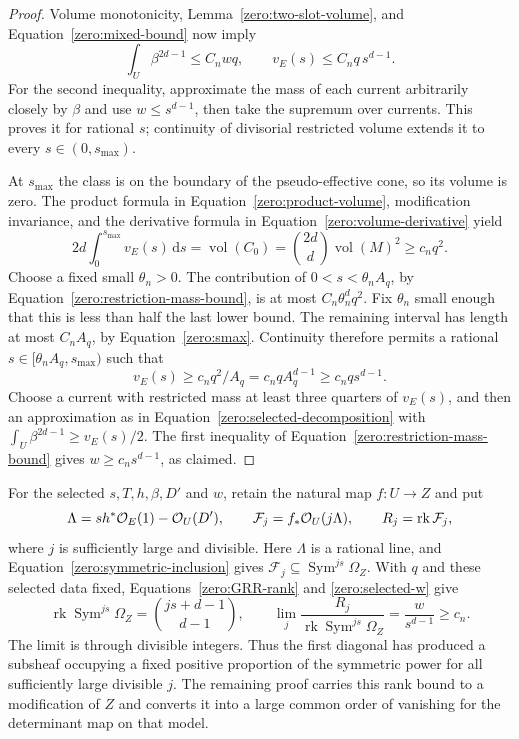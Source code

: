\begin{proof}
Volume monotonicity, Lemma~\ref{zero:two-slot-volume}, and
Equation~\eqref{zero:mixed-bound} now imply
\begin{equation}\label{zero:restriction-mass-bound}
 \int_U\beta^{2d-1}\le C_nwq,\qquad
 v_E(s)\le C_nq\,s^{d-1}.
\end{equation}
For the second inequality, approximate the mass of each current
arbitrarily closely by \(\beta\) and use \(w\le s^{d-1}\), then take
the supremum over currents.  This proves it for rational \(s\);
continuity of divisorial restricted volume extends it to every
\(s\in(0,s_{\max})\).

At \(s_{\max}\) the class is on the boundary of the pseudo-effective
cone, so its volume is zero.  The product formula in
Equation~\eqref{zero:product-volume}, modification invariance, and the derivative
formula in Equation~\eqref{zero:volume-derivative} yield
\begin{equation}\label{zero:total-diagonal-mass}
 2d\int_0^{s_{\max}}v_E(s)\,\mathrm{d} s
  =\operatorname{vol}(C_0)
  =\binom{2d}{d}\operatorname{vol}(M)^2
  \ge c_nq^2 .
\end{equation}
Choose a fixed small \(\theta_n>0\).  The contribution of
\(0<s<\theta_nA_q\), by Equation~\eqref{zero:restriction-mass-bound}, is at
most \(C_n\theta_n^d q^2\).  Fix \(\theta_n\) small enough that this
is less than half the last lower bound.  The remaining interval has
length at most \(C_nA_q\), by Equation~\eqref{zero:smax}.  Continuity therefore
permits a rational \(s\in[\theta_nA_q,s_{\max})\) such that
\[
 v_E(s)\ge c_nq^2/A_q=c_nqA_q^{d-1}
             \ge c_nq s^{d-1}.
\]
Choose a current with restricted mass at least three quarters of
\(v_E(s)\), and then an approximation as in
Equation~\eqref{zero:selected-decomposition} with
\(\int_U\beta^{2d-1}\ge v_E(s)/2\).  The first inequality of
 Equation~\eqref{zero:restriction-mass-bound} gives
 \(w\ge c_ns^{d-1}\), as claimed.
\end{proof}

For the selected \(s,T,h,\beta,D'\) and \(w\), retain the natural map
\(f:U\to Z\) and put
\[
 \Lambda=s h^*\mathcal O_E(1)-\mathcal O_U(D'),\qquad
 \mathcal F_j=f_*\mathcal O_U(j\Lambda),\qquad R_j=\operatorname{rk}\mathcal F_j,
\]
where \(j\) is sufficiently large and divisible.  Here \(\Lambda\) is a
rational line, and Equation~\eqref{zero:symmetric-inclusion} gives
\(\mathcal F_j\subseteq\operatorname{Sym}^{js}\Omega_Z\).  With \(q\) and these selected
data fixed, Equations~\eqref{zero:GRR-rank} and \eqref{zero:selected-w} give
\begin{equation}\label{zero:selected-rank-fraction}
 \operatorname{rk}\operatorname{Sym}^{js}\Omega_Z=\binom{js+d-1}{d-1},\qquad
 \lim_j\frac{R_j}{\operatorname{rk}\operatorname{Sym}^{js}\Omega_Z}
       =\frac{w}{s^{d-1}}\ge c_n .
\end{equation}
The limit is through divisible integers.  Thus the first diagonal has
produced a subsheaf occupying a fixed positive proportion of the symmetric
power for all sufficiently large divisible \(j\).  The remaining proof
carries this rank bound to a modification of \(Z\) and converts it into a
large common order of vanishing for the determinant map on that model.

